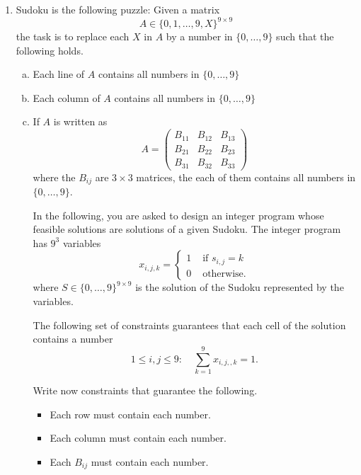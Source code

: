 \documentclass[11pt]{article}
\institute{\'Ecole Polytechnique F\'ed\'erale de Lausanne}
\begin{document}
\makeheader

\begin{enumerate}[1)]

\item Sudoku is the following puzzle: Given a matrix
  \begin{displaymath}
    A ∈ \{0,1,\dots,9,X\}^{9 ×9} 
  \end{displaymath}
  the task is to replace each $X$ in $A$ by a number in $\{0,\dots,9\}$ such that the following holds.
  \begin{enumerate}[a)] 
  \item Each line of $A$ contains all numbers in  $\{0,\dots,9\}$
  \item Each column of $A$ contains all numbers in  $\{0,\dots,9\}$
  \item If $A$ is written as
    \begin{displaymath}
      A =
      \begin{pmatrix}
        B_{11} & B_{12} & B_{13} \\
        B_{21} & B_{22} & B_{23} \\
        B_{31} & B_{32} & B_{33} 
      \end{pmatrix}
    \end{displaymath}
    where the $B_{ij}$ are $3 ×3$ matrices, the each of them contains all numbers in  $\{0,\dots,9\}$.

    \bigskip \noindent

    In the following, you are asked to design an integer program whose feasible solutions are solutions of a given Sudoku. The integer program has $9^3$ variables
    \begin{displaymath}
      x_{i,j,k} =
      \begin{cases}
        1 & \text{ if } s_{i,j} = k \\
        0 & \text{ otherwise.} 
      \end{cases}
    \end{displaymath}
    where $S ∈ \{0,\dots,9\}^{9 ×9}$ is the solution of the Sudoku represented by the variables. 


    The following set of constraints guarantees that each cell of the solution contains a number
    \begin{displaymath}
      1≤i,j≤9: \quad  ∑_{k=1}^9 x_{i,j,,k} = 1. 
    \end{displaymath}

    Write now constraints that guarantee the following.
    \begin{itemize}
    \item Each row must contain each number.
    \item Each column must contain each number.
    \item Each $B_{ij}$ must contain each number. 
    \end{itemize}


\end{enumerate}
\end{enumerate}
\end{document}
